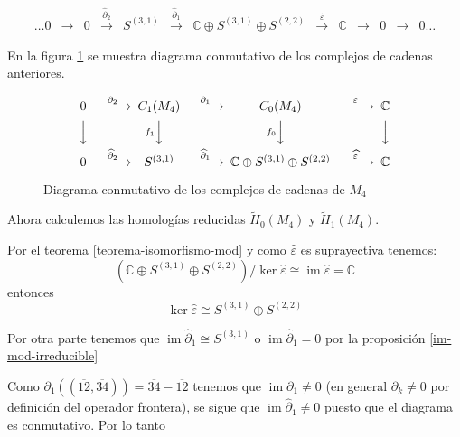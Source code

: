 \documentclass[12pt]{book}
\theoremstyle{definition}
\DeclareMathOperator{\im}{im}
\newcounter{in}
\newcounter{ini}
\begin{document}
\begin{small}
    \[
    \begin{array}{ccccccccccccc}
      \dots 0 & \rightarrow & 0 &
      \stackrel{\widehat\partial_{2}}{\rightarrow} &  S^{(3,1)} &
      \stackrel{\widehat\partial_{1}}{\rightarrow} & \mathbb{C} \oplus
      S^{(3,1)}\oplus S^{(2,2)} & \stackrel{\widehat\varepsilon}{\rightarrow} &
      \mathbb{C} & \rightarrow  & 0 & \rightarrow & 0 \dots
    \end{array} 
    \]
  \end{small}

En la figura \ref{fig:diagrama-conmutativo4} se muestra diagrama
conmutativo de los complejos de cadenas anteriores.
\begin{figure}[!hbtp]
  \centering
  \[
  \begin{CD}
    0 @>{\partial_{2}}>> C_{1}(M_{4}) @>{\partial_{1}}>> C_{0}(M_{4}) @>{\varepsilon}>> \mathbb{C}\\
    @VVV   @V{f_{1}}VV   @V{f_{0}}VV   @VVV    \\
    0 @>{\widehat\partial_{2}}>> S^{(3,1)} @>{\widehat\partial_{1}}>>
    \mathbb{C} \oplus S^{(3,1)}\oplus S^{(2,2)} @>{\widehat
      \varepsilon}>> \mathbb{C}
  \end{CD}
  \]
  
  \caption{Diagrama conmutativo de los complejos de cadenas de $M_{4}$}
\label{fig:diagrama-conmutativo4}
\end{figure}

Ahora calculemos las homologías reducidas $\widetilde H_{0}(M_{4})$ y
$\widetilde H_{1}(M_{4})$.

Por el teorema \ref{teorema-isomorfismo-mod} y como
$\widehat\varepsilon$ es suprayectiva tenemos:
$$(\mathbb{C} \oplus S^{(3,1)}\oplus S^{(2,2)})/\ker\widehat\varepsilon\cong\im\widehat\varepsilon=\mathbb{C}$$
entonces
\begin{equation}
\label{ker-0-4}
\ker\widehat\varepsilon\cong S^{(3,1)}\oplus S^{(2,2)}
\end{equation}

Por otra parte tenemos que $\im\widehat\partial_{1}\cong S^{(3,1)}$ o $\im\widehat\partial_{1}=0$ por
la proposición \ref{im-mod-irreducible}

Como $\partial_{1}((\overline{12},\overline{34}))=\overline{34}-\overline{12}$
tenemos que $\im\partial_{1}\neq 0$ (en general $\partial_{k}\neq 0$
por definición del operador frontera), se sigue que
$\im\widehat\partial_{1}\neq 0$ puesto que el diagrama es
conmutativo. Por lo tanto 
\end{document}
